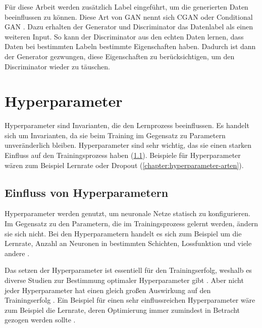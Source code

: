 Für diese Arbeit werden zusätzlich Label eingeführt, um die generierten Daten beeinflussen zu können. 
Diese Art von GAN nennt sich CGAN oder Conditional GAN \cite{gan-conditional}.
Dazu erhalten der Generator und Discriminator das Datenlabel als einen weiteren Input.
So kann der Discriminator aus den echten Daten lernen, dass Daten bei bestimmten Labeln bestimmte Eigenschaften haben.
Dadurch ist dann der Generator gezwungen, diese Eigenschaften zu berücksichtigen, um den Discriminator wieder zu täuschen.

\section{Hyperparameter}
Hyperparameter sind Invarianten, die den Lernprozess beeinflussen.
Es handelt sich um Invarianten, da sie beim Training im Gegensatz zu Parametern unveränderlich bleiben.
Hyperparameter sind sehr wichtig, das sie einen starken Einfluss auf den Trainingsprozess haben (\cref{chapter:hyperparameter-einfluss}).
Beispiele für Hyperparameter wären zum Beispiel Lernrate oder Dropout (\cref{chapter:hyperparameter-arten}).

\subsection{Einfluss von Hyperparametern}
\label{chapter:hyperparameter-einfluss}
Hyperparameter werden genutzt, um neuronale Netze statisch zu konfigurieren.
Im Gegensatz zu den Parametern, die im Trainingsprozess gelernt werden, ändern sie sich nicht.
Bei den Hyperparametern handelt es sich zum Beispiel um die Lernrate, Anzahl an Neuronen in bestimmten Schichten, Lossfunktion und viele andere \cite{hyperparameters-gan-using-genetic-algorithm}.
\newline

Das setzen der Hyperparameter ist essentiell für den Trainingserfolg, weshalb es diverse Studien zur Bestimmung optimaler Hyperparameter gibt \cite{hyperparameters-gan-using-genetic-algorithm, hyperparameters-using-genetic-algorithm-2, hyperparameters-grid-search}. 
Aber nicht jeder Hyperparameter hat einen gleich großen Auswirkung auf den Trainingserfolg \cite{hyperparameters-search-in-machine-learning}.
Ein Beispiel für einen sehr einflussreichen Hyperparameter wäre zum Beispiel die Lernrate, deren Optimierung immer zumindest in Betracht gezogen werden sollte \cite{learning-rate-most-important}.
\newline

